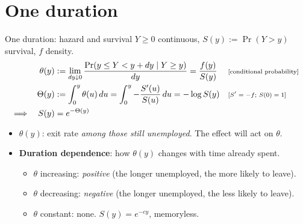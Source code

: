 \documentclass[aspectratio=169,10pt]{beamer}
\newcommand{\why}[1]{\text{\scriptsize[#1]}}
\begin{document}
\section{One duration}
\begin{frame}[label=m-hazard]{One duration: hazard and survival}
  $Y\ge0$ continuous, $S(y):=\Pr(Y>y)$ survival, $f$ density.
  \begin{align*}
    \theta(y) &:= \lim_{dy\downarrow0}\frac{\Pr(y\le Y<y+dy\mid Y\ge y)}{dy} = \frac{f(y)}{S(y)} && \why{conditional probability} \\
    \Theta(y) &:= \int_0^y\theta(u)\,du = \int_0^y -\frac{S'(u)}{S(u)}\,du = -\log S(y) && \why{$S'=-f$; $S(0)=1$} \\
    \Longrightarrow\quad S(y) &= e^{-\Theta(y)}
  \end{align*}
  \begin{itemize}
    \item $\theta(y)$: exit rate \emph{among those still unemployed}. The effect will act on $\theta$.
    \item \textbf{Duration dependence}: how $\theta(y)$ changes with time already spent.
      \begin{itemize}
        \item $\theta$ increasing: \emph{positive} (the longer unemployed, the more likely to leave).
        \item $\theta$ decreasing: \emph{negative} (the longer unemployed, the less likely to leave).
        \item $\theta$ constant: none. $S(y)=e^{-cy}$, memoryless.
      \end{itemize}
  \end{itemize}
  \vfill\hfill\hyperlink{p-hazard}{}
\end{frame}

\end{document}
